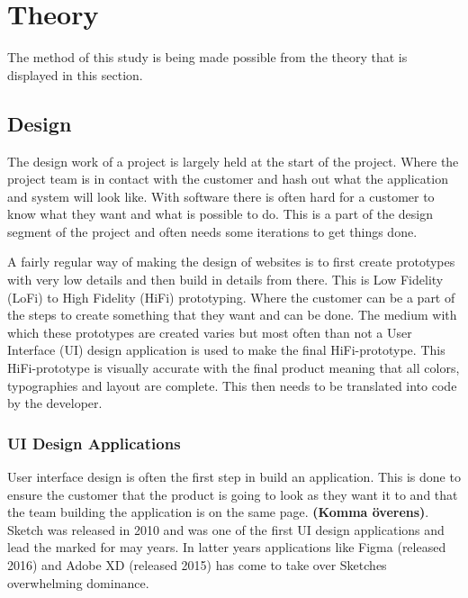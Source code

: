 \section{Theory}

The method of this study is being made possible from the theory that is displayed in this section. 






\subsection{Design}%
\label{sub:Design}
The design work of a project is largely held at the start of the project. Where the project team is in contact with the customer and hash out what the application and system will look like. With software there is often hard for a customer to know what they want and what is possible to do. This is a part of the design segment of the project and often needs some iterations to get things done. 

A fairly regular way of making the design of websites is to first create prototypes with very low details and then build in details from there. This is Low Fidelity (LoFi) to High Fidelity (HiFi) prototyping. Where the customer can be a part of the steps to create something that they want and can be done. The medium with which these prototypes are created varies but most often than not a User Interface (UI) design application is used to make the final HiFi-prototype. This HiFi-prototype is visually accurate with the final product meaning that all colors, typographies and layout are complete. This then needs to be translated into code by the developer.

\subsubsection{UI Design Applications}%
\label{ssub:Apps}
User interface design is often the first step in build an application. This is done to ensure the customer that the product is going to look as they want it to and that the team building the application is on the same page. \textbf{(Komma överens)}.  Sketch \cite{sketchDigitalDesignToolkit} was released in 2010 and was one of the first UI design applications and lead the marked for may years. In latter years applications like Figma \cite{figmaFigmaCollaborativeInterface} (released 2016) and Adobe XD \cite{adobeAdobeXDFast}(released 2015) has come to take over Sketches overwhelming dominance. 

